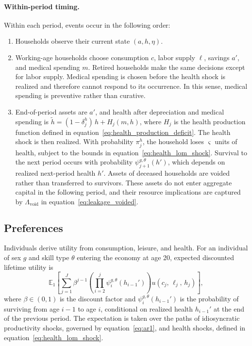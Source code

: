 \documentclass[12pt,a4paper]{article}
\newcommand{\E}{\mathbb{E}}
\begin{document}
\paragraph{Within-period timing.}
Within each period, events occur in the following order:
\begin{enumerate}
\item Households observe their current state $(a,h,\eta)$.

\item Working-age households choose consumption $c$, labor supply $\ell$, savings $a'$, and medical spending $m$. Retired households make the same decisions except for labor supply. Medical spending is chosen before the health shock is realized and therefore cannot respond to its occurrence. In this sense, medical spending is preventive rather than curative.

\item End-of-period assets are $a'$, and health after depreciation and medical spending is $\tilde h = (1-\delta_j^h)\,h + H_j(m,h)$, where $H_j$ is the health production function defined in equation~\eqref{eq:health_production_deficit}. The health shock is then realized. With probability $\pi^h_j$, the household loses $\varsigma$ units of health, subject to the bounds in equation~\eqref{eq:health_lom_shock}. Survival to the next period occurs with probability $\psi_{j+1}^{g,\theta}(h')$, which depends on realized next-period health $h'$. Assets of deceased households are voided rather than transferred to survivors. These assets do not enter aggregate capital in the following period, and their resource implications are captured by $\Lambda_{\mathrm{void}}$ in equation~\eqref{eq:leakage_voided}.
\end{enumerate}


\subsection{Preferences}
\label{subsec:preferences}


Individuals derive utility from consumption, leisure, and health. For an individual of sex $g$ and skill type $\theta$ entering the economy at age 20, expected discounted lifetime utility is
\begin{equation}
\label{eq:lifetime_utility}
\E_1 \left[\sum_{j=1}^{J} \beta^{j-1} \left(\prod_{i=2}^{j} \psi_{i}^{g,\theta}(h_{i-1}')\right) u(c_j,\, \ell_j,\, h_j)\right],
\end{equation}
where $\beta \in (0,1)$ is the discount factor and $\psi_i^{g,\theta}(h_{i-1}')$ is the probability of surviving from age $i-1$ to age $i$, conditional on realized health $h_{i-1}'$ at the end of the previous period. The expectation is taken over the paths of idiosyncratic productivity shocks, governed by equation~\eqref{eq:ar1}, and health shocks, defined in equation~\eqref{eq:health_lom_shock}.
\end{document}
